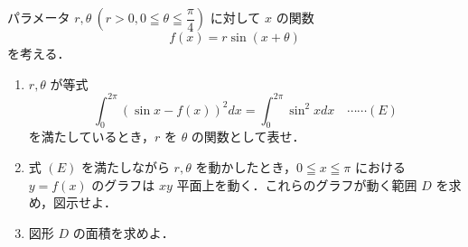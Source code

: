 \documentclass[../../main.tex]{subfiles}
\begin{document}
パラメータ $r, \theta \ (r > 0, 0 \leqq \theta \leqq \dfrac{\pi}{4})$ に対して $x$ の関数
$$ f(x) = r \sin(x + \theta) $$
を考える．

\begin{enumerate}
  \item $r, \theta$ が等式
    $$ \int_0^{2\pi} (\sin x - f(x))^2 dx = \int_0^{2\pi} \sin^2 x dx \quad \cdots\cdots (E) $$
    を満たしているとき，$r$ を $\theta$ の関数として表せ．
  \item 式 $(E)$ を満たしながら $r, \theta$ を動かしたとき，$0 \leqq x \leqq \pi$ における $y = f(x)$ のグラフは $xy$ 平面上を動く．これらのグラフが動く範囲 $D$ を求め，図示せよ．
  \item 図形 $D$ の面積を求めよ．
\end{enumerate}
\end{document}
